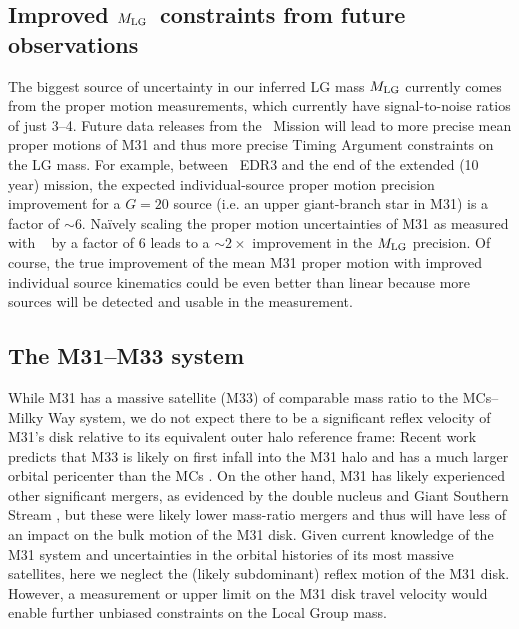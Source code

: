 \documentclass[twocolumn]{aastex631}
\newcommand{\kc}[1]{\textcolor{pink}{\textbf{#1}} }
\newcommand{\mlg}{\ensuremath{M_{\rm LG}}}
\begin{document}




\subsection{Improved \mlg\ constraints from future observations}

The biggest source of uncertainty in our inferred LG mass $\mlg$ currently comes
from the proper motion measurements, which currently have signal-to-noise ratios
of just 3--4.
Future data releases from the \gaia\ Mission \citep{GaiaOverview2016} will lead
to more precise mean proper motions of M31 and thus more precise Timing Argument
constraints on the LG mass.
For example, between \gaia\ EDR3 and the end of the extended (10 year) mission,
the expected individual-source proper motion precision improvement for a $G=20$
source (i.e. an upper giant-branch star in M31) is a factor of $\sim$6.
Na\"ively scaling the proper motion uncertainties of M31 as measured with \gaia\
\citep{Salomon2021} by a factor of 6 leads to a $\sim2\times$ improvement in the
$\mlg$ precision.
Of course, the true improvement of the mean M31 proper motion with improved
individual source kinematics could be even better than linear because more
sources will be detected and usable in the measurement.


\subsection{The M31--M33 system}

While M31 has a massive satellite (M33) of comparable mass ratio to the
MCs--Milky Way system, we do not expect there to be a significant reflex
velocity of M31's disk relative to its equivalent outer halo reference frame:
Recent work predicts that M33 is likely on first infall into the M31 halo and
has a much larger orbital pericenter than the MCs \citep[e.g.,][]{Patel2017a}.
On the other hand, M31 has likely experienced other significant mergers, as
evidenced by the double nucleus and Giant Southern Stream \citep{TODO} \todo{GSS
reference?}, but these were likely lower mass-ratio mergers and thus will have
less of an impact on the bulk motion of the M31 disk.
Given current knowledge of the M31 system and uncertainties in the orbital
histories of its most massive satellites, here we neglect the (likely
subdominant) reflex motion of the M31 disk.
However, a measurement or upper limit on the M31 disk travel velocity would
enable further unbiased constraints on the Local Group mass.
\end{document}
